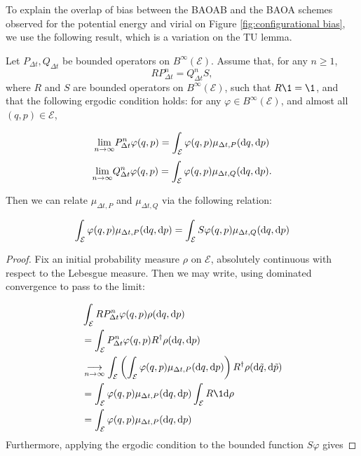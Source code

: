To explain the overlap of bias between the BAOAB and the BAOA schemes observed for the potential energy and virial on Figure \ref{fig:configurational bias}, we use the following result, which is a variation on the TU lemma.
\begin{lemma}\label{TU_like_lemma}
    Let $P_{\Delta t}, Q_{\Delta t}$ be bounded operators on $B^\infty(\mathcal E)$.
    Assume that, for any $n\geq 1$,
    $$ R P_{\Delta t}^n = Q_{\Delta t}^n S,$$
    where $R$ and $S$ are bounded operators on $B^\infty (\mathcal E)$, such that $R\1=\1$, and that the following ergodic condition holds: for any $\varphi \in B^\infty(\mathcal E)$, and almost all $(q,p) \in \mathcal E$,

    $$ \underset{n\to\infty}\lim P_{\Delta t}^n\varphi (q,p) = \int_{\mathcal E} \varphi(q,p)\mu_{\Delta t,P}(\text d q,\text d p) $$
    $$ \underset{n\to\infty}\lim Q_{\Delta t}^n\varphi (q,p) = \int_{\mathcal E} \varphi(q,p)\mu_{\Delta t,Q}(\text d q,\text d p).$$

    Then  we can relate $\mu_{\Delta t,P}$ and $\mu_{\Delta t,Q}$ via the following relation:

    \begin{equation}
        \label{TU_like_lemma_ccl}
    \int_{\mathcal E} \varphi(q,p) \mu_{\Delta t,P}(\text d q,\text d p)=\int_{\mathcal E} S\varphi(q,p) \mu_{\Delta t,Q}(\text d q,\text d p)
    \end{equation}
    \begin{proof}
        Fix an initial probability measure $\rho$ on $\mathcal E$, absolutely continuous with respect to the Lebesgue measure. Then we may write, using dominated convergence to pass to the limit:

        \begin{align*}
            &\int_{\mathcal E}RP_{\Delta t}^n \varphi(q,p)\rho(\text d q,\text d p)\\
            &=\int_{\mathcal E}P_{\Delta t}^n \varphi(q,p)R^{\dagger}\rho(\text d q,\text d p)\\
            &\underset{n\to\infty}{\longrightarrow}\int_{\mathcal E} \left(\int_{\mathcal E}\varphi(q,p)\mu_{\Delta t,P}(\text d q,\text d p)\right) R^\dagger \rho(\text d \tilde q,\text d \tilde p)\\
            &=\int_{\mathcal E}\varphi(q,p)\mu_{\Delta t,P}(\text d q,\text d p)\int_{\mathcal E}R\1 \text d \rho\\
            &=\int_{\mathcal E}\varphi(q,p)\mu_{\Delta t,P}(\text d q,\text d p)
        \end{align*}
        Furthermore, applying the ergodic condition to the bounded function $S\varphi$ gives


\end{proof}
\end{lemma}
